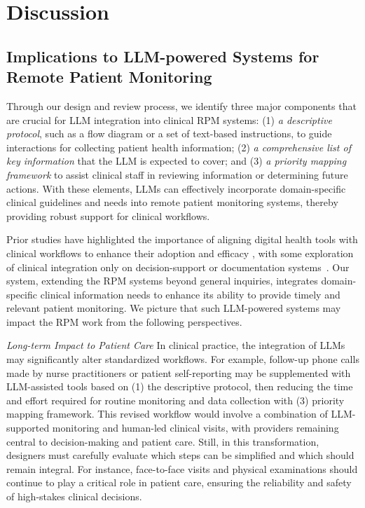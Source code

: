 \section{Discussion}

\subsection{Implications to LLM-powered Systems for Remote Patient Monitoring}
Through our design and review process, we identify three major components that are crucial for LLM integration into clinical RPM systems: 
(1) \textit{a descriptive protocol}, such as a flow diagram or a set of text-based instructions, to guide interactions for collecting patient health information; 
(2) \textit{a comprehensive list of key information} that the LLM is expected to cover; and 
(3) \textit{a priority mapping framework} to assist clinical staff in reviewing information or determining future actions.
With these elements, LLMs can effectively incorporate domain-specific clinical guidelines and needs into remote patient monitoring systems, thereby providing robust support for clinical workflows.

Prior studies have highlighted the importance of aligning digital health tools with clinical workflows to enhance their adoption and efficacy \cite{staras2021using, marwaha2022deploying}, with some exploration of clinical integration only on decision-support or documentation systems~\cite{chen2024burextract, rajashekar2024human}.
Our \projectname{} system, extending the RPM systems beyond general inquiries, integrates domain-specific clinical information needs to enhance its ability to provide timely and relevant patient monitoring. We picture that such LLM-powered systems may impact the RPM work from the following perspectives.








\textit{Long-term Impact to Patient Care}
In clinical practice, the integration of LLMs may significantly alter standardized workflows. 
For example, follow-up phone calls made by nurse practitioners or patient self-reporting may be supplemented with LLM-assisted tools based on (1) the descriptive protocol, then reducing the time and effort required for routine monitoring and data collection with (3) priority mapping framework. This revised workflow would involve a combination of LLM-supported monitoring and human-led clinical visits, with providers remaining central to decision-making and patient care. 
Still, in this transformation, designers must carefully evaluate which steps can be simplified and which should remain integral. 
For instance, face-to-face visits and physical examinations should continue to play a critical role in patient care, ensuring the reliability and safety of high-stakes clinical decisions.



